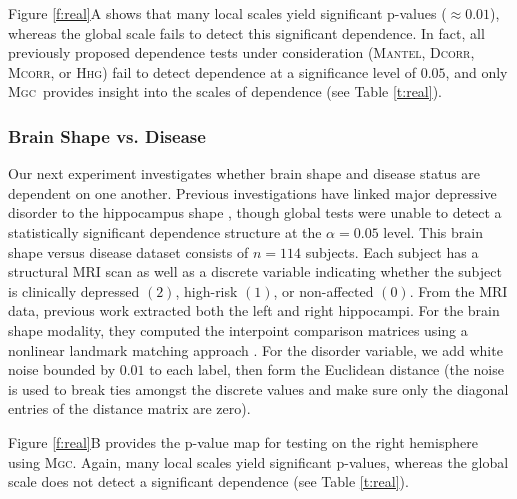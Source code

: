 \documentclass[11pt]{article}
\providecommand{\sct}[1]{{\normalfont\textsc{#1}}}
\newcommand{\Mgc}{\sct{Mgc}}
\newcommand{\Hhg}{\sct{Hhg}}
\newcommand{\Dcorr}{\sct{Dcorr}}
\newcommand{\Mcorr}{\sct{Mcorr}}
\newcommand{\Mantel}{\sct{Mantel}}
\begin{document}


Figure \ref{f:real}{\color{magenta}A}  shows that many local scales yield significant p-values ($\approx 0.01$), whereas the global scale fails to detect this significant dependence. In fact, all previously proposed dependence tests under consideration (\Mantel, \Dcorr, \Mcorr, or \Hhg) fail to detect dependence at a significance level of $0.05$, and only \Mgc~provides  insight into the scales of dependence (see Table \ref{t:real}).

\subsubsection*{Brain Shape vs. Disease} %


Our next experiment investigates whether brain shape and disease status are dependent on one another.  Previous investigations have linked major depressive disorder to the hippocampus shape \cite{ParkEtAl2008,PosenerEtAl2003}, though global tests were unable to detect a statistically significant dependence structure at the $\alpha=0.05$ level.
%
This brain shape versus disease dataset consists of $n=114$ subjects. Each subject has a structural MRI scan as well as a discrete variable indicating whether the subject is clinically depressed $(2)$, high-risk $(1)$, or non-affected $(0)$.  From the MRI data, previous work  extracted both the left and right hippocampi.   For the brain shape modality, they computed the interpoint comparison matrices using a nonlinear landmark matching approach \cite{ParkEtAl2008,BegEtAl2005}. For the  disorder variable, we add white noise bounded by $0.01$ to each label, then form the Euclidean distance (the noise is used to break ties amongst the discrete values and make sure only the diagonal entries of the distance matrix are zero).

Figure \ref{f:real}{\color{magenta}B} provides the p-value map for testing on the right hemisphere using \Mgc. Again, many local scales yield significant p-values, whereas the global scale does not detect a significant dependence  (see Table \ref{t:real}). 
\end{document}
